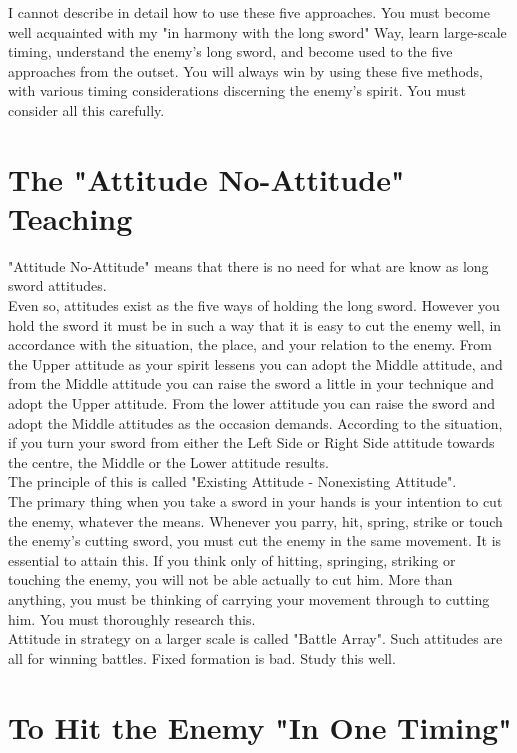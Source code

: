 I cannot describe in detail how to use these five approaches. You must become well acquainted with my "in harmony with the long sword" Way, learn large-scale timing, understand the enemy's long sword, and become used to the five approaches from the outset. You will always win by using these five methods, with various timing considerations discerning the enemy's spirit. You must consider all this carefully.\\
\section{The "Attitude No-Attitude" Teaching}

"Attitude No-Attitude" means that there is no need for what are know as long sword attitudes.\\

Even so, attitudes exist as the five ways of holding the long sword. However you hold the sword it must be in such a way that it is easy to cut the enemy well, in accordance with the situation, the place, and your relation to the enemy. From the Upper attitude as your spirit lessens you can adopt the Middle attitude, and from the Middle attitude you can raise the sword a little in your technique and adopt the Upper attitude. From the lower attitude you can raise the sword and adopt the Middle attitudes as the occasion demands. According to the situation, if you turn your sword from either the Left Side or Right Side attitude towards the centre, the Middle or the Lower attitude results.\\

The principle of this is called "Existing Attitude - Nonexisting Attitude".\\

The primary thing when you take a sword in your hands is your intention to cut the enemy, whatever the means. Whenever you parry, hit, spring, strike or touch the enemy's cutting sword, you must cut the enemy in the same movement. It is essential to attain this. If you think only of hitting, springing, striking or touching the enemy, you will not be able actually to cut him. More than anything, you must be thinking of carrying your movement through to cutting him. You must thoroughly research this.\\

Attitude in strategy on a larger scale is called "Battle Array". Such attitudes are all for winning battles. Fixed formation is bad. Study this well.\\
\section{To Hit the Enemy "In One Timing"}


